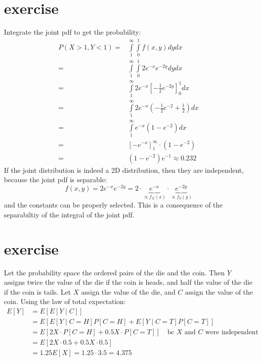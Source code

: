 \documentclass{article}
\begin{document}
\section{exercise}
Integrate the joint pdf to get the probability:
\[
    \begin{aligned}
        P(X>1, Y<1) = & \int\limits_1^\infty  {\int\limits_{ 0 }^1 {f\left( {x,y} \right)dy} dx}          \\
        =             & \int\limits_1^\infty  {\int\limits_{ 0 }^1 2e^{-x}e^{-2y} dy} dx                  \\
        =             & \int\limits_1^\infty  {2e^{-x}\left[ { - \frac{1}{2}e^{-2y}} \right]_0^1} dx      \\
        =             & \int\limits_1^\infty  {2e^{-x}\left( - \frac{1}{2}e^{-2} + \frac{1}{2} \right)dx} \\
        =             & \int\limits_1^\infty  {e^{-x}\left( 1 - e^{-2} \right)dx}                         \\
        =             & \left[ { - e^{-x}} \right]_1^\infty \cdot \left( 1 - e^{-2} \right)               \\
        =             & \left( 1 - e^{-2} \right)e^{-1} \approx 0.232
    \end{aligned}
\]
If the joint distribution is indeed a 2D distribution,
then they are independent, because the joint pdf is separable:
\[
    f(x,y) = 2e^{-x}e^{-2y} = 2 \cdot \underbrace {e^{-x}}_{\propto f_X(x)} \cdot \underbrace {e^{-2y}}_{\propto f_Y(y)}
\]
and the constants can be properly selected. This is a consequence of the separabiltiy of the integral of the joint pdf.
\section{exercise}
Let the probability space the ordered pairs of the die and the coin.
Then $Y$ assigns twice the value of the die if the coin is heads,
and half the value of the die if the coin is tails.
Let $X$ assign the value of the die, and $C$ assign the value of the coin.
Using the law of total expectation:
\[
    \begin{aligned}
        E[Y] & = E[E[Y \mid C]]                                                                         \\
             & = E[E[Y \mid C = H]P[C = H] + E[Y \mid C = T]P[C = T]]                                   \\
             & = E[2X \cdot P[C = H] + 0.5X \cdot P[C = T]] \quad\text{bc $X$ and $C$ were independent} \\
             & = E[2X \cdot 0.5 + 0.5X \cdot 0.5]                                                       \\
             & =  1.25E[X] = 1.25 \cdot 3.5 = 4.375
    \end{aligned}
\]
\end{document}
